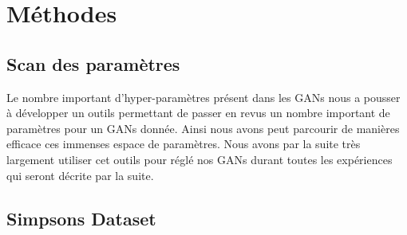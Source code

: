 \documentclass[11pt,francais]{article}
\begin{document}
\section{Méthodes}

\subsection{Scan des paramètres}
\label{sec:ParamsScans}
Le nombre important d'hyper-paramètres présent dans les GANs nous a pousser à développer un outils permettant de passer en revus un nombre important de paramètres pour un GANs donnée. Ainsi nous avons peut parcourir de manières efficace ces immenses espace de paramètres.
Nous avons par la suite très largement utiliser cet outils pour réglé nos GANs durant toutes les expériences qui seront décrite par la suite. 

\subsection{Simpsons Dataset}
\label{sec:SimpsonsDataset}
\end{document}
